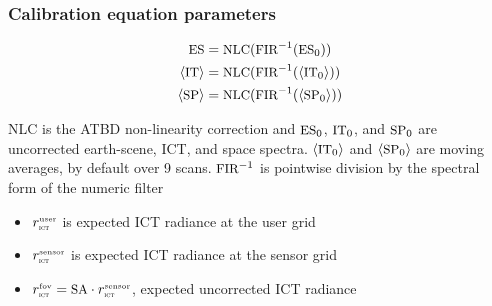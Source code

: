 \documentclass[9pt]{beamer}
\begin{document}
\begin{frame}
\frametitle{Calibration equation parameters}

\vspace{-8mm}
\begin{align*}
  \mbox{\small ES} &= \mbox{\small NLC}(\mbox{\small FIR}^{-1}(\mbox{\small ES}_0)) \\
  \langle\mbox{\small IT}\rangle &= \mbox{\small NLC}(\mbox{\small FIR}^{-1}(\langle\mbox{\small IT}_0\rangle)) \\
  \langle\mbox{\small SP}\rangle &= \mbox{\small NLC}(\mbox{\small FIR}^{-1}(\langle\mbox{\small SP}_0\rangle)) \\
\end{align*}
\vspace{-8mm}

{\small NLC} is the ATBD non-linearity correction and $\mbox{\small ES}_0$,
$\mbox{\small IT}_0$, and $\mbox{\small SP}_0$ are uncorrected earth-scene, ICT, and space
spectra.  $\langle\mbox{\small IT}_0\rangle$ and $\langle\mbox{\small SP}_0\rangle$ are moving
averages, by default over 9 scans.  $\mbox{\small FIR}^{-1}$ is pointwise division
by the spectral form of the numeric filter

\begin{itemize}
  \item $r_{\mbox{\tiny\textsc{ict}}}^{\mbox{\tiny user}}$ is expected ICT radiance at the user grid
  \item $r_{\mbox{\tiny\textsc{ict}}}^{\mbox{\tiny sensor}}$ is expected ICT radiance at the sensor grid
  \item $r_{\mbox{\tiny\textsc{ict}}}^{\mbox{\tiny fov}} = \mbox{\small SA} \cdot r_{\mbox{\tiny\textsc{ict}}}^{\mbox{\tiny sensor}}$, expected uncorrected ICT
    radiance 
\end{itemize}

\end{frame}
\end{document}
